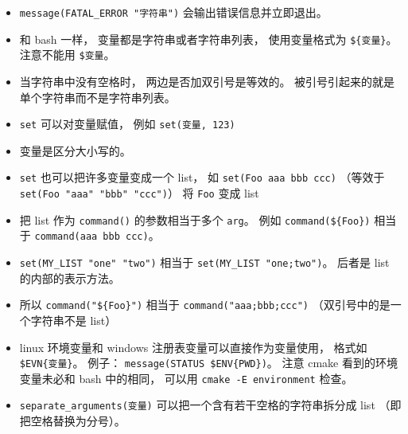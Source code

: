 \begin{itemize}
\item \verb|message(FATAL_ERROR "字符串")| 会输出错误信息并立即退出。
\item 和 bash 一样， 变量都是字符串或者字符串列表， 使用变量格式为 \verb`${变量}`。 注意不能用 \verb|$变量|。
\item 当字符串中没有空格时， 两边是否加双引号是等效的。 被引号引起来的就是单个字符串而不是字符串列表。
\item \verb`set` 可以对变量赋值， 例如 \verb`set(变量, 123)`
\item 变量是区分大小写的。
\item \verb`set` 也可以把许多变量变成一个 list， 如 \verb`set(Foo aaa bbb ccc)` （等效于 \verb|set(Foo "aaa" "bbb" "ccc")|） 将 \verb`Foo` 变成 list
\item 把 list 作为 \verb|command()| 的参数相当于多个 \verb|arg|。 例如 \verb`command(${Foo})` 相当于 \verb`command(aaa bbb ccc)`。
\item \verb|set(MY_LIST "one" "two")| 相当于 \verb|set(MY_LIST "one;two")|。 后者是 list 的内部的表示方法。
\item 所以 \verb`command("${Foo}")` 相当于 \verb`command("aaa;bbb;ccc")` （双引号中的是一个字符串不是 list）
\item linux 环境变量和 windows 注册表变量可以直接作为变量使用， 格式如 \verb`$EVN{变量}`。 例子： \verb|message(STATUS $ENV{PWD})|。 注意 cmake 看到的环境变量未必和 bash 中的相同， 可以用 \verb`cmake -E environment` 检查。
\item \verb|separate_arguments(变量)| 可以把一个含有若干空格的字符串拆分成 list （即把空格替换为分号）。
\end{itemize}

